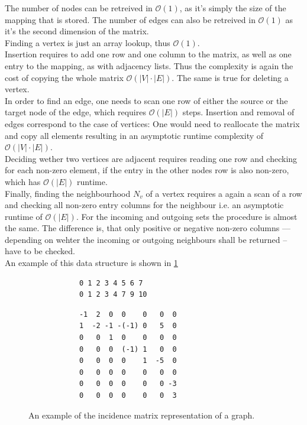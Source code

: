         The number of nodes can be retreived in $\mathcal{O}(1)$, as it's simply the size of the mapping that is stored.
        The number of edges can also be retreived in $\mathcal{O}(1)$ as it's the second dimension of the matrix.\\

        Finding a vertex is just an array lookup, thus $\mathcal{O}(1)$. \\

        Insertion requires to add one row and one column to the matrix, as well as one entry to the mapping, as with adjacency lists. Thus the complexity is again the cost of copying the whole matrix $\mathcal{O}(|V| \cdot |E|)$. The same is true for deleting a vertex. \\
        
        In order to find an edge, one needs to scan one row of either the source or the target node of the edge, which requires $\mathcal{O}(|E|)$ steps.
        Insertion and removal of edges correspond to the case of vertices: One would need to reallocate the matrix and copy all elements resulting in an asymptotic runtime complexity of $\mathcal{O}(|V| \cdot |E|)$. \\
        
        Deciding wether two vertices are adjacent requires reading one row and checking for each non-zero element, if the entry in the other nodes row is also non-zero, which has $\mathcal{O}(|E|)$ runtime.\\
        
        Finally, finding the neighbourhood $N_v$ of a vertex requires a again a scan of a row and checking all non-zero entry columns for the neighbour i.e. an asymptotic runtime of $\mathcal{O}(|E|)$. 
        For the incoming and outgoing sets the procedure is almost the same. The difference is, that only positive or negative non-zero columns --- depending on wehter the incoming or outgoing neighbours shall be returned -- have to be checked.\\
        
        An example of this data structure is shown in \ref{incm}
        
        \begin{figure}[htp]
         \begin{center}
         \begin{verbatim}
            0 1 2 3 4 5 6 7
            0 1 2 3 4 7 9 10
          \end{verbatim}
          \begin{verbatim}
            -1  2  0  0    0   0  0
            1  -2 -1 -(-1) 0   5  0
            0   0  1  0    0   0  0
            0   0  0  (-1) 1   0  0
            0   0  0  0    1  -5  0
            0   0  0  0    0   0  0
            0   0  0  0    0   0 -3
            0   0  0  0    0   0  3
          \end{verbatim}
         \end{center}
         \caption{An example of the incidence matrix representation of a graph.}
         \label{incm}
        \end{figure}
        
